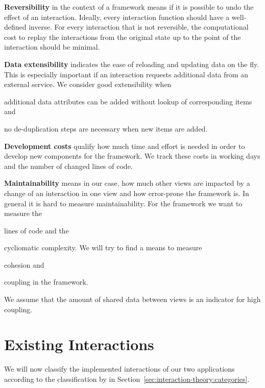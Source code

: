 \textbf{Reversibility} in the context of a \cmv{} framework means if it is possible to undo the effect of an interaction.
Ideally, every interaction function should have a well-defined inverse.
For every interaction that is not reversible, the computational cost to replay the interactions from the original state up to the point of the interaction should be minimal.

\textbf{Data extensibility} indicates the ease of reloading and updating data on the fly.
This is especially important if an interaction requests additional data from an external service.
We consider good extensibility when
\begin{enumerate*}[label=(\arabic*)]
  \item
    additional data attributes can be added without lookup of corresponding items and
  \item
    no de-duplication steps are necessary when new items are added.
\end{enumerate*}

\textbf{Development costs} qualify how much time and effort is needed in order to develop new components for the \cmv{} framework.
We track these costs in working days and the number of changed lines of code.


\textbf{Maintainability} means in our case, how much other views are impacted by a change of an interaction in one view and how error-prone the framework is.
In general it is hard to measure maintainability.
For the \cmv{} framework we want to measure the
\begin{enumerate*}[label=(\arabic*)]
  \item
    lines of code and the
  \item
    cycliomatic complexity. We will try to find a means to measure
  \item
    cohesion and
  \item
    coupling in the framework.
\end{enumerate*}
We assume that the amount of shared data between views is an indicator for high coupling.


\section{Existing Interactions}
We will now classify the implemented interactions of our two applications according to the classification by \textcite{Yi2007} in Section~\ref{sec:interaction-theory:categories}.

